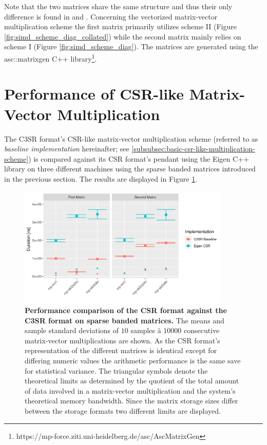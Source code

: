     Note that the two matrices share the same structure and thus their only difference is found in \V and \VS. Concerning the vectorized matrix-vector multiplication scheme the first matrix primarily utilizes scheme II (Figure \ref{fig:simd_scheme_diag_collated}) while the second matrix mainly relies on scheme I (Figure \ref{fig:simd_scheme_diag}). The matrices are generated using the asc::matrixgen C++ library\footnote{https://mp-force.ziti.uni-heidelberg.de/asc/AscMatrixGen}.

  \section{Performance of CSR-like Matrix-Vector Multiplication}

    The C3SR format's CSR-like matrix-vector multiplication scheme (referred to as \emph{baseline implementation} hereinafter; see \ref{subsubsec:basic-csr-like-multiplication-scheme}) is compared against its CSR format's pendant using the Eigen C++ library \cite{eigen:website} on three different machines using the sparse banded matrices introduced in the previous section. The results are displayed in Figure \ref{fig:baseline_arithmetic_performance}.

    \begin{figure}[!ht]
      \centering
      \includegraphics[width=0.9\textwidth]{assets/eigen_vs_c3sr_baseline}
      \caption[Performance comparison of the CSR format against the C3SR format on sparse banded matrices.]{\textbf{Performance comparison of the CSR format against the C3SR format on sparse banded matrices.} The means and sample standard deviations of $10$ samples à $10000$ consecutive matrix-vector multiplications are shown. As the CSR format's representation of the different matrices is identical except for differing numeric values the arithmetic performance is the same save for statistical variance. The triangular symbols denote the theoretical limits as determined by the quotient of the total amount of data involved in a matrix-vector multiplication and the system's theoretical memory bandwidth. Since the matrix storage sizes differ between the storage formats two different limits are displayed.}
      \label{fig:baseline_arithmetic_performance}
    \end{figure}

